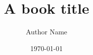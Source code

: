 \documentclass[
a5paper,
pagesize,
10pt,
bibtotoc,
pointlessnumbers,
headings=small,
notitlepage,
DIV=16,
twoside]{scrbook}
\title{A book title}
\author{Author Name}
\date{\today}
\begin{document}
\begin{comment}

\begin{titlepage}
		\centering{
			{\fontsize{40}{48}\selectfont 
			A book title}
		}\\
			
		\vspace{10mm}
		\centering{\Large{Author Name}}\\
		\vspace{\fill}
		\centering \large{2011}
\end{titlepage}
\newpage{}
\thispagestyle {empty}

\vspace*{2cm}

\begin{center}
	\Large{\parbox{10cm}{
		\begin{raggedright}
		{\Large 
			\textit{Do what you think is interesting, 
			do something that you think is fun and worthwhile, 
			because otherwise you won’t do it well anyway.}
		}
	
		\vspace{.5cm}\hfill{---Brian W. Kernighan}
		\end{raggedright}
	}
}
\end{center}
\end{comment}

\renewcommand\partname{Buch}
\renewcommand\contentsname{\centering Inhaltsverzeichnis}
\tableofcontents
\newpage
\pagestyle{plain}
\setcounter{secnumdepth}{0} %





\newpage



\begin{comment}
Just some notes, not visible in pdf.
\end{comment}
\end{document}
